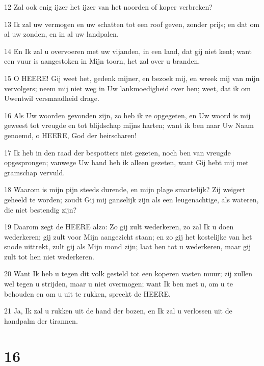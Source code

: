 \par 12 Zal ook enig ijzer het ijzer van het noorden of koper verbreken?
\par 13 Ik zal uw vermogen en uw schatten tot een roof geven, zonder prijs; en dat om al uw zonden, en in al uw landpalen.
\par 14 En Ik zal u overvoeren met uw vijanden, in een land, dat gij niet kent; want een vuur is aangestoken in Mijn toorn, het zal over u branden.
\par 15 O HEERE! Gij weet het, gedenk mijner, en bezoek mij, en wreek mij van mijn vervolgers; neem mij niet weg in Uw lankmoedigheid over hen; weet, dat ik om Uwentwil versmaadheid drage.
\par 16 Als Uw woorden gevonden zijn, zo heb ik ze opgegeten, en Uw woord is mij geweest tot vreugde en tot blijdschap mijns harten; want ik ben naar Uw Naam genoemd, o HEERE, God der heirscharen!
\par 17 Ik heb in den raad der bespotters niet gezeten, noch ben van vreugde opgesprongen; vanwege Uw hand heb ik alleen gezeten, want Gij hebt mij met gramschap vervuld.
\par 18 Waarom is mijn pijn steeds durende, en mijn plage smartelijk? Zij weigert geheeld te worden; zoudt Gij mij ganselijk zijn als een leugenachtige, als wateren, die niet bestendig zijn?
\par 19 Daarom zegt de HEERE alzo: Zo gij zult wederkeren, zo zal Ik u doen wederkeren; gij zult voor Mijn aangezicht staan; en zo gij het kostelijke van het snode uittrekt, zult gij als Mijn mond zijn; laat hen tot u wederkeren, maar gij zult tot hen niet wederkeren.
\par 20 Want Ik heb u tegen dit volk gesteld tot een koperen vasten muur; zij zullen wel tegen u strijden, maar u niet overmogen; want Ik ben met u, om u te behouden en om u uit te rukken, spreekt de HEERE.
\par 21 Ja, Ik zal u rukken uit de hand der bozen, en Ik zal u verlossen uit de handpalm der tirannen.

\chapter{16}

